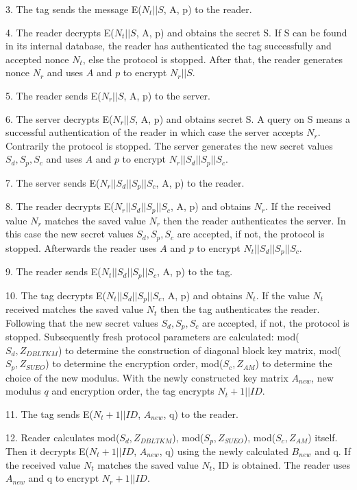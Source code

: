     3. The tag sends the message E($N_t||S$, A, p) to the reader. 

    4. The reader decrypts E($N_t||S$, A, p) and obtains the secret S. If S can be found in its internal database, the reader has authenticated the tag successfully and accepted nonce $N_t$, else the protocol is stopped. 
        After that, the reader generates nonce $N_r$ and uses $A$ and $p$ to encrypt $N_r||S$. 

    5. The reader sends E($N_r||S$, A, p) to the server. 

    6. The server decrypts E($N_r||S$, A, p) and obtains secret S. A query on S means a successful authentication of the reader in which case the server accepts $N_r$. Contrarily the protocol is stopped.
        The server generates the new secret values $S_d, S_p, S_c$ and uses $A$ and $p$ to encrypt $N_r||S_d||S_p||S_c$.

    7. The server sends E($N_r||S_d||S_p||S_c$, A, p) to the reader. 

    8. The reader decrypts E($N_r||S_d||S_p||S_c$, A, p) and obtains $N_r$. If the received value $N_r$ matches the saved value $N_r$ then the reader authenticates 
    the server. In this case the new secret values 
        $S_d,S_p,S_c$ are accepted, if not, the protocol is stopped. Afterwards the reader uses $A$ and $p$ to encrypt $N_t||S_d||S_p||S_c$. 

    9. The reader sends E($N_t||S_d||S_p||S_c$, A, p) to the tag. 

    10. The tag decrypts E($N_t||S_d||S_p||S_c$, A, p) and obtains $N_t$. If the value $N_t$ received matches the saved value $N_t$ then the tag authenticates the reader. Following that the new secret values 
        $S_d,S_p,S_c$ are accepted, if not, the protocol is stopped. Subsequently fresh protocol parameters are calculated: mod($S_d, Z_{DBLTKM}$) to determine the construction of diagonal block key matrix, 
        mod($S_p, Z_{SUEO}$) to determine the encryption order, mod($S_c, Z_{AM}$) to determine the choice of the new modulus. With the newly constructed key matrix $A_{new}$, new modulus $q$ and encryption order, the tag 
        encrypts $N_t+1||ID$.

    11. The tag sends E($N_t+1||ID$, $A_{new}$, q) to the reader.
    
    12. Reader calculates mod($S_d, Z_{DBLTKM}$), mod($S_p, Z_{SUEO}$), mod($S_c, Z_{AM}$) itself. Then it decrypts E($N_t+1||ID$, $A_{new}$, q) 
    using the newly calculated $B_{new}$ and q. If the received value $N_t$ matches the saved value $N_t$, ID is obtained. The reader uses $A_{new}$ and q to encrypt $N_r+1||ID$. 

